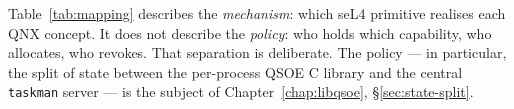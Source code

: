 Table~\ref{tab:mapping} describes the \emph{mechanism}: which seL4
primitive realises each QNX concept.  It does not describe the
\emph{policy}: who holds which capability, who allocates, who revokes.
That separation is deliberate.  The policy --- in particular, the split
of state between the per-process QSOE C library and the central
\texttt{taskman} server --- is the subject of Chapter~\ref{chap:libqsoe},
\S\ref{sec:state-split}.

